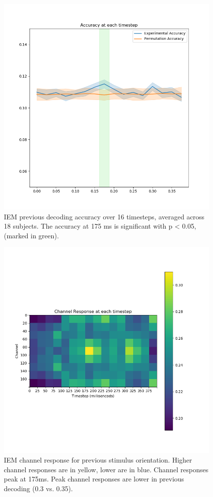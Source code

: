\documentclass[../main.tex]{subfiles}
\begin{document}
\begin{figure}
    \centering
    \includegraphics[scale=0.7]{figures/results/timestep_accuracy_iem_prev.png}
    \caption{IEM previous decoding accuracy over 16 timesteps, averaged across 18 subjects. The accuracy at 175 ms is significant with p < 0.05, (marked in green).}
    \label{iem_timestep_accuracy_prev}
\end{figure}

\begin{figure}
    \centering
    \includegraphics[scale=0.7]{figures/results/timestep_ch_response_prev.png}
    \caption{IEM channel response for previous stimulus orientation. Higher channel responses are in yellow, lower are in blue. Channel responses peak at 175ms. Peak channel responses are lower in previous decoding (0.3 vs. 0.35).}
    \label{timestep_ch_response_prev}
\end{figure}
\end{document}
